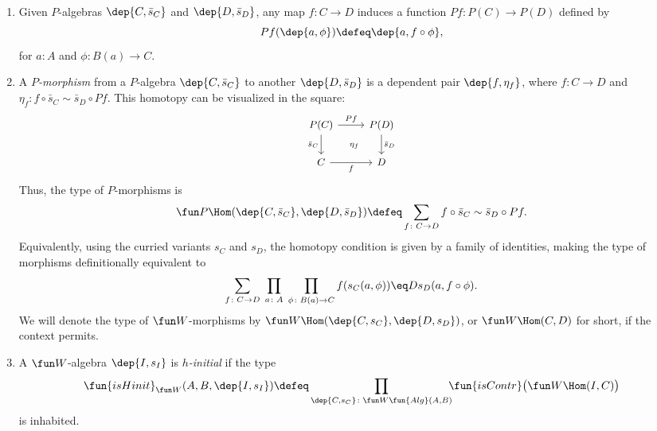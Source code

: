 \begin{defns}\ 
    \begin{enumerate}[-]
        \item Given $P$-algebras $\dep{C,\bar{s}_C}$ and $\dep{D,\bar{s}_D}$, any map $f\colon C\to D$ induces a function $Pf\colon P(C)\to P(D)$ defined by
        \[
            Pf(\dep{a,\phi})\defeq\dep{a,f\circ\phi},
        \]
        for $a\colon A$ and $\phi\colon B(a)\to C$.
        
        \item A \textsl{$P$-morphism} from a $P$-algebra $\dep{C,\bar{s}_C}$ to another $\dep{D,\bar{s}_D}$ is a dependent pair $\dep{f,\eta_f}$, where $f\colon C\to D$ and $\eta_f\colon f\circ\bar{s}_C\sim\bar{s}_D\circ Pf$. This homotopy can be visualized in the square:
        \[
            \begin{tikzcd}[font=\small]
                P(C)\arrow[r,"Pf"]
                        \arrow[d,"\bar{s}_C"']
                        \arrow[dr,
                            phantom,
                            "\scriptstyle\eta_f"]
                    &P(D)
                        \arrow[d,"\bar{s}_D"]\\
                C
                        \arrow[r,"f"']
                    &D
            \end{tikzcd}
        \]
        Thus, the type of $P$-morphisms is
        \[
            \fun P\Hom(\dep{C,\bar{s}_C},\dep{D,\bar{s}_D})
                \defeq\sum_{f\colon C\to D}
                    f\circ\bar{s}_C\sim\bar{s}_D\circ Pf.
        \]
        Equivalently, using the curried variants $s_C$ and $s_D$, the homotopy condition is given by a family of identities, making the type of morphisms definitionally equivalent to
        \begin{equation}\label{eq:structure-coherence}
            \sum_{f\colon C\to D}\;
                \prod_{a\colon A}\;
                \prod_{\phi\colon B(a)\to C}
                    f(s_C(a,\phi))\eq Ds_D(a,f\circ\phi).
        \end{equation}
        We will denote the type of $\fun W$-morphisms by $\fun W\Hom(\dep{C,s_C},\dep{D,s_D})$, or $\fun W\Hom(C,D)$ for short, if the context permits.

        \item A $\fun W$-algebra $\dep{I,s_I}$ is \textsl{$h$-initial} if the type
        \[
            \fun{isHinit}_{\fun W}(A,B,\dep{I,s_I})
            \defeq
            \prod_{\dep{C,s_C}\colon\fun W\fun{Alg}(A,B)}
            \!\!\!\fun{isContr}
            \bigl(
                \fun W\Hom(I,C)
            \bigr)
        \]
        is inhabited.
    \end{enumerate}
\end{defns}

